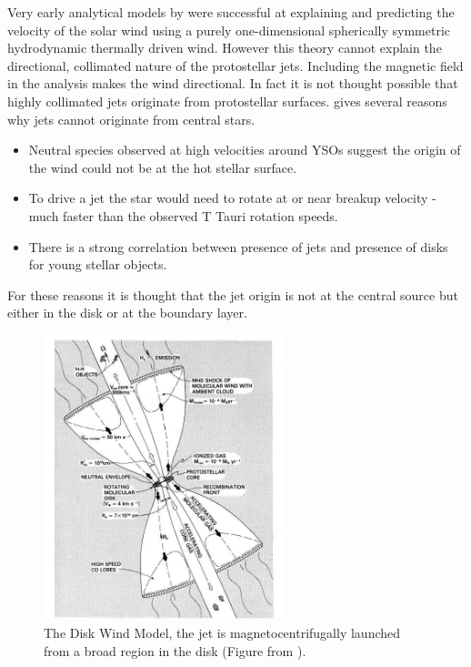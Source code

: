 Very early analytical models by \citet{1958ApJ...128..664P} were successful at explaining and predicting the velocity of the solar wind using a purely one-dimensional spherically symmetric hydrodynamic thermally driven wind.
However this theory cannot explain the directional, collimated nature of the protostellar jets.
Including the magnetic field in the analysis \citep{1967ApJ...148..217W} makes the wind directional.
In fact it is not thought possible that highly collimated jets originate from protostellar surfaces.
\citet{1996ARA&A..34..111B} gives several reasons why jets cannot originate from central stars.
\begin{itemize}
\item Neutral species observed at high velocities around YSOs suggest the origin of the wind could not be at the hot stellar surface.
\item To drive a jet the star would need to rotate at or near breakup velocity - much faster than the observed T Tauri rotation speeds.
\item There is a strong correlation between presence of jets and presence of disks for young stellar objects.
\end{itemize}
For these reasons it is thought that the jet origin is not at the central source but either in the disk or at the boundary layer.



\begin{figure}[th]
\centering
\includegraphics[width=7cm]{pudritz86}
\caption{
The Disk Wind Model, the jet is magnetocentrifugally launched from a broad region in the disk (Figure from \citet{1980ApJ...239L..17S}).
}
\label{fig:DiskWind} %
\end{figure}


